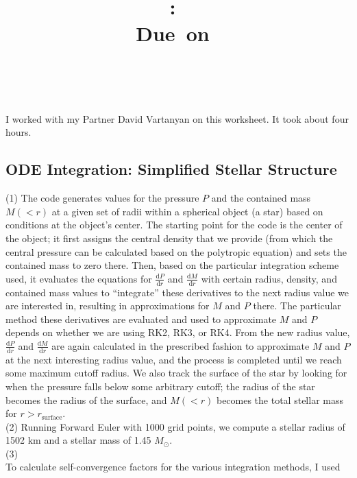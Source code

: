 \documentclass{article}
\title{\vspace{2in}\textmd{\textbf{\hmwkClass:\ \hmwkTitle}}\\\normalsize\vspace{0.1in}\small{Due\ on\ \hmwkDueDate}\\\vspace{0.1in}\large{\textit{\hmwkClassInstructor\ \hmwkClassTime}}\vspace{3in}}
\date{}
\author{\textbf{\hmwkAuthorName}}
\newcommand{\deri}[2]{\frac{\mathrm{d} #1}{\mathrm{d} #2}}
\begin{document}
\begin{spacing}{1.1}

\newpage


I worked with my Partner David Vartanyan on this worksheet. It took about four hours.

\subsection{ODE Integration: Simplified Stellar Structure}

\noindent (1) The code generates values for the pressure \(P\) and the contained mass \(M(<r)\) at a given set of radii within a spherical object (a star) based on conditions at the object's center. The starting point for the code is the center of the object; it first assigns the central density that we provide (from which the central pressure can be calculated based on the polytropic equation) and sets the contained mass to zero there. Then, based on the particular integration scheme used, it evaluates the equations for \( \deri{P}{r} \) and \( \deri{M}{r} \) with certain radius, density, and contained mass values to ``integrate'' these derivatives to the next radius value we are interested in, resulting in approximations for \(M\) and \(P\) there. The particular method these derivatives are evaluated and used to approximate \(M\) and \(P\) depends on whether we are using RK2, RK3, or RK4. From the new radius value, \( \deri{P}{r} \) and \( \deri{M}{r} \) are again calculated in the prescribed fashion to approximate \(M\) and \(P\) at the next interesting radius value, and the process is completed until we reach some maximum cutoff radius. We also track the surface of the star by looking for when the pressure falls below some arbitrary cutoff; the radius of the star becomes the radius of the surface, and \(M(<r)\) becomes the total stellar mass for \(r > r_\text{surface}\). \\

\noindent (2) Running Forward Euler with 1000 grid points, we compute a stellar radius of 1502 km and a stellar mass of 1.45 \(M_\odot\). \\

\noindent (3) \\

To calculate self-convergence factors for the various integration methods, I used


\end{spacing}
\end{document}
